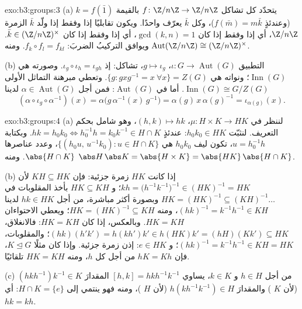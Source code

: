 \begin{solution}{exo:b3:groups:3}
(a) يتحدّد كل تشاكل $f \colon \Z/n\Z \to \Z/n\Z$ بالقيمة $k =
f(\bar 1)$ (وعندئذٍ $f(\bar m) = m\bar k$)، وكل
$\bar k$ يعرّف واحدًا. ويكون تقابليًا إذا وفقط إذا ولّد $\bar k$
الزمرة $\Z/n\Z$، أي إذا وفقط إذا كان $\gcd(k,n) = 1$، أي إذا وفقط
إذا كان $\bar k \in (\Z/n\Z)^\times$. ويوافق التركيبُ الضربَ: $f_k \circ f_l = f_{kl}$. ومنه $\operatorname{Aut}(\Z/n\Z) \cong (\Z/n\Z)^\times$.

(b) التطبيق $\iota\colon G \to \operatorname{Aut}(G)$، $g \mapsto
\iota_g$، تشاكل: إذ $\iota_g \circ \iota_h = \iota_{gh}$. وصورته هي $\operatorname{Inn}(G)$؛
ونواته هي $\{g : gxg^{-1} =
x\ \forall x\} = Z(G)$. وتعطي مبرهنة التماثل الأولى $\operatorname{Inn}(G) \cong G/Z(G)$. أما
 في $\operatorname{Aut}(G)$: فمن أجل $\alpha \in \operatorname{Aut}(G)$ لدينا
\[
(\alpha \circ \iota_g \circ \alpha^{-1})(x)
= \alpha\bigl(g\,\alpha^{-1}(x)\,g^{-1}\bigr)
= \alpha(g)\, x\, \alpha(g)^{-1} = \iota_{\alpha(g)}(x).
\]
\end{solution}

\begin{solution}{exo:b3:groups:4}
(a) لننظر في $\mu \colon H \times K \to HK$، $(h,k) \mapsto hk$، وهو شامل بحكم التعريف. لنثبّت
$h_0k_0 \in HK$: عندئذٍ $hk = h_0k_0
\iff h_0^{-1}h = k_0 k^{-1} \in H \cap K$. وبكتابة $u =
h_0^{-1}h$، تكون ليف
$h_0k_0$ هي $\{(h_0u,\, u^{-1}k_0) : u
\in H \cap K\}$، وعدد عناصرها $\abs{H \cap K}$. ومنه $\abs
H\,\abs K = \abs{H\times K} = \abs{HK}\,\abs{H \cap K}$.

(b) إذا كانت $HK$ زمرة جزئية: فإن $KH \subseteq HK$ لأن $kh =
\bigl(h^{-1}k^{-1}\bigr)^{-1} \in (HK)^{-1} = HK$؛ و $HK
\subseteq KH$
بأخذ المقلوبات في $HK = (HK)^{-1} \subseteq
(KH)^{-1}\dots$ وبصورة أكثر مباشرة، من أجل $hk \in HK$
لدينا $(hk)^{-1} =
k^{-1}h^{-1} \in KH$، ومنه $HK = (HK)^{-1} \subseteq KH$؛ ويعطي الاحتواءان $HK = KH$. وبالعكس،
إذا كان $HK = KH$: فالانغلاق، $(hk)(h'k') = h(kh')k' \in h(HK)k' = (hH)(Kk') \subseteq HK$؛ والمقلوبات، $(hk)^{-1} = k^{-1}h^{-1} \in KH = HK$؛
و $e \in HK$: إذن زمرة جزئية. وإذا كان مثلًا $K \trianglelefteq G$، فإن
$hK = Kh$ من أجل كل $h$، ومنه $HK = KH$ تلقائيًا.

(c) من أجل $h \in H$ و $k \in K$، يساوي  $[h,k] = hkh^{-1}
k^{-1}$ المقدارَ
$(hkh^{-1})k^{-1} \in K$ (لأن $K$ ) والمقدارَ $h(kh^{-1}k^{-1}) \in H$ (لأن $H$ )، ومنه
فهو ينتمي إلى $H \cap K =
\{e\}$: أي $hk = kh$.
\end{solution}

